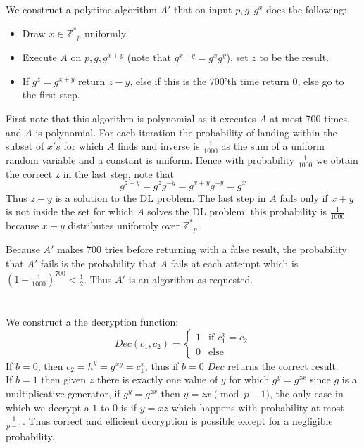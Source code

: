 \documentclass{article}
\begin{document}
\section{} %

We construct a polytime algorithm $A'$ that on input $p, g,g^x$ does the following:
\begin{itemize}
\item Draw $x\in \mathbb{Z^*}_{p}$ uniformly.
\item Execute $A$ on $p, g, g^{x+y}$ (note that $g^{x+y} = g^x g^y$), set $z$ to be the result.
\item  If $g^z = g^{x+y}$ return $z - y$, else if this is the 700'th time return 0, else go to the first step.
\end{itemize}
First note that this algorithm is polynomial as it executes $A$ at most 700 times, and $A$ is polynomial.
For each iteration the probability of landing within the subset of $x's$ for which $A$ finds and inverse is $\frac{1}{1000}$ as the sum of a uniform random variable and a constant is uniform. Hence with probability $\frac{1}{1000}$ we obtain the correct z in the last step, note that
\[g^{z-y} = g^z g^{-y} = g^{x+y}  g^{-y} = g^x\]
Thus $z-y$ is a solution to the DL problem.
The last step in $A$ fails only if $x+y$  is not inside the set for which $A$ solves the DL problem, this probability is $\frac{1}{1000}$ because $x+y$ distributes uniformly over $\mathbb{Z^*}_{p}$.

Because $A'$ makes 700 tries before returning with a false result, the probability that $A'$ fails is the probability that $A$ fails at each attempt which is $ (1-\frac{1}{1000})^{700} < \frac{1}{2}$.
Thus $A'$ is an algorithm as requested.

\section{} %

\subsection{} %
We construct a the decryption function:
\[
Dec(c_1, c_2) = 
\begin{cases}
	 1 &\mbox{if }  c_1^x = c_2 \\ 
	 0 &\mbox{else}
\end{cases} 
\]
If $b=0$, then $c_2 = h^y = g^{xy} = c_1^x $, thus if $b=0$ $Dec$ returns the correct result.\\
If $b=1$ then given $z$ there is exactly one value of $y$ for which $g^y = g^{zx}$ since $g$ is a multiplicative generator, if  $g^y = g^{zx}$ then $y = zx \pmod {p-1}$, the only case in which we decrypt a $1$ to $0$ is if $y = xz$ which happens with probability at most $\frac{1}{p - 1}$.
Thus correct and efficient decryption is possible except for a negligible probability.
\end{document}
